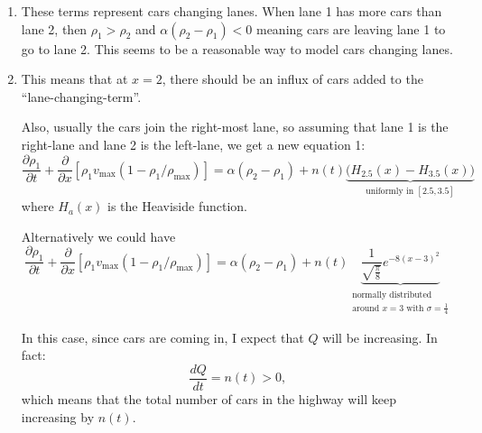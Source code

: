 \begin{enumerate}
\begin{enumerate}
	\item These terms represent cars changing lanes. When lane 1 has more cars than lane 2, then $\rho_1>\rho_2$ and $\alpha(\rho_2-\rho_1) <0$ meaning cars are leaving lane 1 to go to lane 2. This seems to be a reasonable way to model cars changing lanes.
	
	\item This means that at $x=2$, there should be an influx of cars added to the ``lane-changing-term''.
	
	Also, usually the cars join the right-most lane, so assuming that lane 1 is the right-lane and lane 2 is the left-lane, we get a new equation 1:
		\begin{equation}\label{entrance1}\tag{$S_1$}			
		\frac{\partial \rho_1}{\partial t} + \frac{\partial}{\partial x} \left[ \rho_1 v_{\max}(1-\rho_1/\rho_{\max})\right] = 	\alpha (\rho_2 - \rho_1) + n(t)\underbrace{\big(H_{2.5}(x)-H_{3.5}(x)\big)}_{\text{uniformly in }[2.5, 3.5]}
		\end{equation}
		where $H_a(x)$ is the Heaviside function.
		
		Alternatively we could have
		\begin{equation}\label{entrance2}\tag{$S_2$}			
		\frac{\partial \rho_1}{\partial t} + \frac{\partial}{\partial x} \left[ \rho_1 v_{\max}(1-\rho_1/\rho_{\max})\right] = 	\alpha (\rho_2 - \rho_1) + n(t)\underbrace{\frac{1}{\sqrt{\frac{\pi}{8}}}e^{-8(x-3)^2}}_{\substack{\text{normally distributed}\\\text{around $x=3$ with $\sigma=\frac14$}}}
		\end{equation}

		In this case, since cars are coming in, I expect that $Q$ will be increasing. In fact:
		\[
		\frac{dQ}{dt} = n(t) > 0,
		\]
		which means that the total number of cars in the highway will keep increasing by $n(t)$.
	
\end{enumerate}


\end{enumerate}